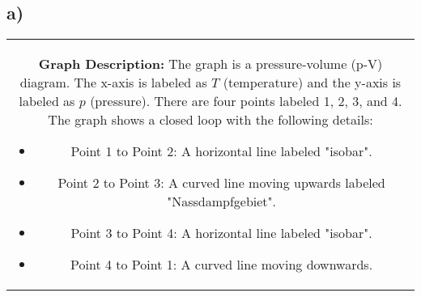 

\subsection*{a)}

\begin{center}
\begin{tabular}{c}
\begin{minipage}{0.8\textwidth}
\textbf{Graph Description:} The graph is a pressure-volume (p-V) diagram. The x-axis is labeled as $T$ (temperature) and the y-axis is labeled as $p$ (pressure). There are four points labeled 1, 2, 3, and 4. The graph shows a closed loop with the following details:
\begin{itemize}
    \item Point 1 to Point 2: A horizontal line labeled "isobar".
    \item Point 2 to Point 3: A curved line moving upwards labeled "Nassdampfgebiet".
    \item Point 3 to Point 4: A horizontal line labeled "isobar".
    \item Point 4 to Point 1: A curved line moving downwards.
\end{itemize}
\end{minipage}
\end{tabular}
\end{center}